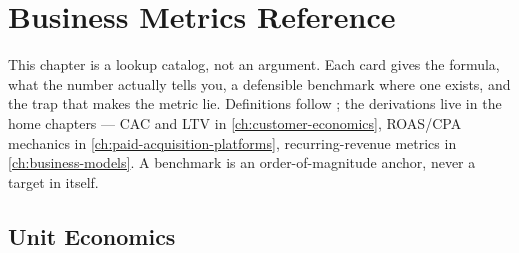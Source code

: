 \chapter{Business Metrics Reference}\label{ch:metrics-catalog}


This chapter is a lookup catalog, not an argument. Each card gives the formula, what the number actually tells you, a defensible benchmark where one exists, and the trap that makes the metric lie. Definitions follow \textcite{bendle2020marketing}; the derivations live in the home chapters --- CAC and LTV in \cref{ch:customer-economics}, ROAS/CPA mechanics in \cref{ch:paid-acquisition-platforms}, recurring-revenue metrics in \cref{ch:business-models}. A benchmark is an order-of-magnitude anchor, never a target in itself.

\section{Unit Economics}

